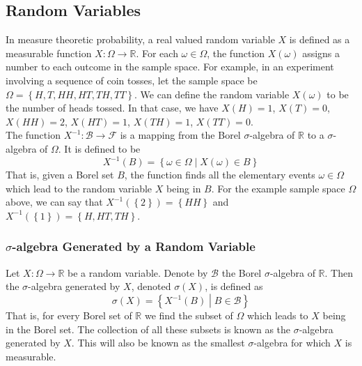 \documentclass[11pt]{report} %
\begin{document}
\subsection{Random Variables}

In measure theoretic probability, a real valued random variable $X$ is defined as a measurable function $X: \Omega \to \mathbb{R}$. For each $\omega \in \Omega$, the function $X\left(\omega\right)$ assigns a number to each outcome in the sample space. For example, in an experiment involving a sequence of coin tosses, let the sample space be $\Omega = \left\{H, T, HH, HT, TH, TT\right\}$. We can define the random variable $X\left(\omega\right)$ to be the number of heads tossed. In that case, we have $X\left(H\right) = 1$, $X\left(T\right) = 0$, $X\left(HH\right) = 2$, $X\left(HT\right) = 1$, $X\left(TH\right) = 1$, $X\left(TT\right) = 0$. \\

The function $X^{-1}: \mathcal{B} \to \mathcal{F}$ is a mapping from the Borel $\sigma$-algebra of $\mathbb{R}$ to a $\sigma$-algebra of $\Omega$. It is defined to be
\begin{equation}
X^{-1}\left(B\right) = \left\{\omega\in\Omega\middle|X\left(\omega\right)\in B\right\}
\end{equation}
That is, given a Borel set $B$, the function finds all the elementary events $\omega\in\Omega$ which lead to the random variable $X$ being in $B$. For the example sample space $\Omega$ above, we can say that $X^{-1}\left(\left\{2\right\}\right) = \left\{HH\right\}$ and $X^{-1}\left(\left\{1\right\}\right) = \left\{H, HT, TH\right\}$.

\subsubsection{$\sigma$-algebra Generated by a Random Variable}

Let $X: \Omega\to\mathbb{R}$ be a random variable. Denote by $\mathcal{B}$ the Borel $\sigma$-algebra of $\mathbb{R}$. Then the $\sigma$-algebra generated by $X$, denoted $\sigma\left(X\right)$, is defined as
\begin{equation}
\sigma\left(X\right) = \left\{X^{-1}\left(B\right)\middle|B\in\mathcal{B}\right\}
\end{equation}
That is, for every Borel set of $\mathbb{R}$ we find the subset of $\Omega$ which leads to $X$ being in the Borel set. The collection of all these subsets is known as the $\sigma$-algebra generated by $X$. This will also be known as the smallest $\sigma$-algebra for which $X$ is measurable.
\end{document}
